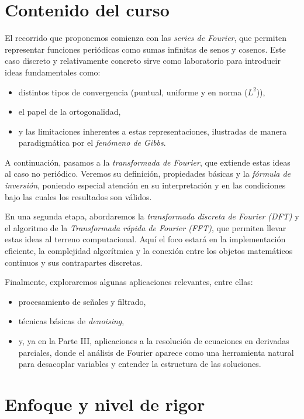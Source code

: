 \documentclass[12pt, a4paper]{amsbook}
\theoremstyle{remark}
\theoremstyle{definition}
\numberwithin{section}{chapter}
\numberwithin{subsection}{section}
\numberwithin{equation}{section}
\numberwithin{figure}{chapter}
\begin{document}
\section{Contenido del curso}

El recorrido que proponemos comienza con las {\em series de Fourier}, que permiten representar funciones periódicas como sumas infinitas de senos y cosenos. Este caso discreto y relativamente concreto sirve como laboratorio para introducir ideas fundamentales como:
\begin{itemize}
\item distintos tipos de convergencia (puntual, uniforme y en norma ($L^2$)),
\item el papel de la ortogonalidad,
\item y las limitaciones inherentes a estas representaciones, ilustradas de manera paradigmática por el {\em fenómeno de Gibbs}.
\end{itemize}

A continuación, pasamos a la {\em transformada de Fourier}, que extiende estas ideas al caso no periódico. Veremos su definición, propiedades básicas y la {\em fórmula de inversión}, poniendo especial atención en su interpretación y en las condiciones bajo las cuales los resultados son válidos.

En una segunda etapa, abordaremos la {\em transformada discreta de Fourier (DFT)} y el algoritmo de la {\em Transformada rápida de Fourier (FFT)}, que permiten llevar estas ideas al terreno computacional. Aquí el foco estará en la implementación eficiente, la complejidad algorítmica y la conexión entre los objetos matemáticos continuos y sus contrapartes discretas.

Finalmente, exploraremos algunas aplicaciones relevantes, entre ellas:
\begin{itemize}
\item procesamiento de señales y filtrado,
\item técnicas básicas de {\em denoising},
\item y, ya en la Parte III, aplicaciones a la resolución de ecuaciones en derivadas parciales, donde el análisis de Fourier aparece como una herramienta natural para desacoplar variables y entender la estructura de las soluciones.
\end{itemize}

\section{Enfoque y nivel de rigor}
\end{document}
